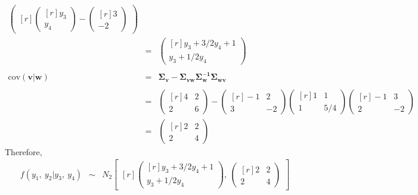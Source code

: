 \documentclass[12pt]{article} %
\begin{document}
\begin{enumerate}
\begin{enumerate}
\begin{enumerate}
\begin{eqnarray*}
\begin{pmatrix}[r]
\begin{pmatrix}[r]
						y_{3} \\
						y_{4}
						\end{pmatrix}-
						\begin{pmatrix}[r]
						 3 \\
						-2
						\end{pmatrix}
					\end{pmatrix}\\
					&=&
					\begin{pmatrix}[r]
					y_{3}+3/2y_{4}+1 \\
					y_{3}+1/2y_{4}
					\end{pmatrix}\\
					\\
				\mathrm{cov}(\mathbf{v|w}) &=& 
				\mathbf{\Sigma_{\mathbf{v}}-\Sigma_{\mathbf{vw}}\Sigma_{\mathbf{w}}^{-1}\Sigma_{\mathbf{wv}}}\\
				\\
				&=&
				\begin{pmatrix}[r]
					4 & 2 \\
					2 & 6				 
				\end{pmatrix}-				
				\begin{pmatrix}[r]
					-1 & 2 \\
					3 & -2
				\end{pmatrix}
				\begin{pmatrix}[r]
					1 & 1	\\
					1 & 5/4				
				\end{pmatrix}
				\begin{pmatrix}[r]
					-1 & 3 \\
					 2 & -2
				\end{pmatrix}\\
				&=&
				\begin{pmatrix}[r]
					2 & 2 \\
					2 & 4
				\end{pmatrix}
				\end{eqnarray*}
				Therefore, 
				\begin{eqnarray*}
					f(y_{1},~y_{2} | y_{3},~y_{4})&\sim&
					N_{2}
					\begin{bmatrix}[r]
						\begin{pmatrix}[r]
							y_{3}+3/2y_{4}+1 \\
							y_{3}+1/2y_{4}							
						\end{pmatrix},~
						\begin{pmatrix}[r]
							2 & 2 \\
							2 & 4
						\end{pmatrix}
					\end{bmatrix}
				\end{eqnarray*}
			\end{enumerate}
			

\end{enumerate}
\end{enumerate}
\end{document}
